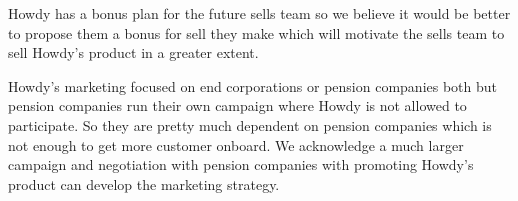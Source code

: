 \noindent Howdy has a bonus plan for the future sells team so we believe it would be better to propose them a bonus for sell they make which will motivate the sells team to sell Howdy’s product in a greater extent.

\noindent Howdy’s marketing focused on end corporations or pension companies both but pension companies run their own campaign where Howdy is not allowed to participate. So they are pretty much dependent on pension companies which is not enough to get more customer onboard. We acknowledge a much larger campaign and negotiation with pension companies with promoting Howdy’s product can develop the marketing strategy.